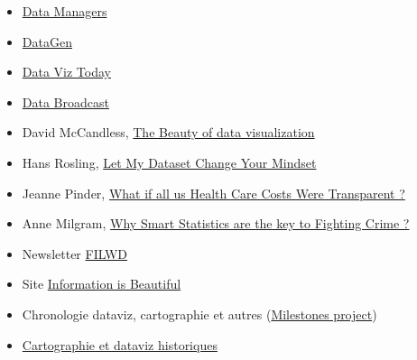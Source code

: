 \documentclass[
  letterpaper,
  DIV=11,
  numbers=noendperiod]{scrreprt}
\begin{document}
\begin{itemize}
\item
  \href{https://podcasts-francais.fr/podcast/data-managers}{Data
  Managers}
\item
  \href{https://www.datageneration.co/}{DataGen}
\item
  \href{https://dataviztoday.com/}{Data Viz Today}
\item
  \href{https://www.youtube.com/channel/UCCM1N0W0Ht3cMj84n_D1d4g}{Data
  Broadcast}
\item
  David McCandless,
  \href{https://www.ted.com/talks/david_mccandless_the_beauty_of_data_visualization}{The
  Beauty of data visualization}
\item
  Hans Rosling,
  \href{https://www.ted.com/talks/hans_rosling_let_my_dataset_change_your_mindset}{Let
  My Dataset Change Your Mindset}
\item
  Jeanne Pinder,
  \href{https://www.ted.com/talks/jeanne_pinder_what_if_all_us_health_care_costs_were_transparent?referrer=playlist-making_sense_of_too_much_data\&autoplay=true}{What
  if all us Health Care Costs Were Transparent ?}
\item
  Anne Milgram,
  \href{https://www.ted.com/talks/anne_milgram_why_smart_statistics_are_the_key_to_fighting_crime?referrer=playlist-making_sense_of_too_much_data\&autoplay=true}{Why
  Smart Statistics are the key to Fighting Crime ?}
\item
  Newsletter \href{https://filwd.substack.com/}{FILWD}
\item
  Site \href{http://www.informationisbeautiful.net}{Information is
  Beautiful}
\item
  Chronologie dataviz, cartographie et autres
  (\href{https://www.datavis.ca/milestones/}{Milestones project})
\item
  \href{https://www.davidrumsey.com/}{Cartographie et dataviz
  historiques}
\end{itemize}
\end{document}
